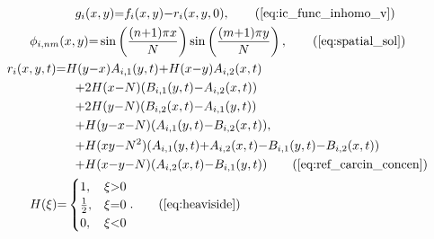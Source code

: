 \documentclass[\main/thesis.tex]{subfiles}
\begin{document}
\begin{align}
	&\hspace{1.00in} g_i(x, y)               {=} f_i(x, y) {-} r_i(x, y, 0), 
	                 \tag{\ref{eq:ic_func_inhomo_v}} \\
	&\hspace{0.50in} \phi_{i,nm}(x, y)       {=} \sin\left(
	                                                   \frac{(n {+} 1) \pi x}
	                                                        {N} 
	                                                 \right) 
	                                             \sin\left(
	                                                   \frac{(m {+} 1) \pi y}
	                                                        {N}
	                                                 \right),
	                 \tag{\ref{eq:spatial_sol}}\\
	&\hspace{0.25in} r_i(x, y, t)            {=}   H(y {-} x)          	A_{i,1}(y, t)
	                                         {+}   H(x {-} y)           A_{i,2}(x, t)
	                 \nonumber \\
	&\hspace{1.00in}                         {+} 2 H(x {-} N)          (B_{i,1}(y, t) 
	                                                                {-} A_{i,2}(x, t))
	                 \nonumber \\
	&\hspace{1.00in}                         {+} 2 H(y {-} N)      	   (B_{i,2}(x,t) 
	                                                                {-} A_{i,1}(y, t))
	                 \nonumber \\
	&\hspace{1.00in}                         {+}   H(y {-} x {-} N)    (A_{i,1}(y, t)
	                                                                {-} B_{i,2}(x, t)),
	                 \nonumber \\
	&\hspace{1.00in}                         {+}   H(xy {-} N^2)       (A_{i,1}(y, t)
	                                                                {+} A_{i,2}(x, t) 
	                                                                {-} B_{i,1}(y, t) 
	                                                                {-} B_{i,2}(x, t))
	                 \nonumber \\
	&\hspace{1.00in}                         {+}   H(x {-} y {-} N)    (A_{i,2}(x, t) 
                           	                                        {-} B_{i,1}(y, t))
	                 \tag{\ref{eq:ref_carcin_concen}} \\
	&\hspace{0.50in} H(\xi) {=} \begin{cases}
	                                1,           &\xi {>} 0 \\
		                            \frac{1}
		                                 {2},    &\xi {=} 0 \\
		                            0,           &\xi {<} 0
	                            \end{cases}.
	\tag{\ref{eq:heaviside}}\\
\end{align}
\end{document}
